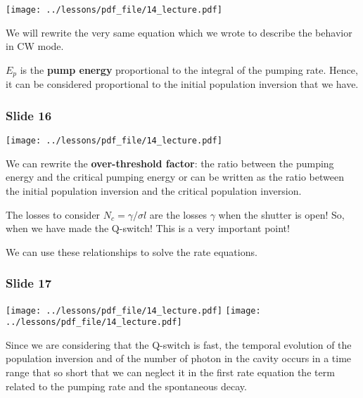 \documentclass[../main/main.tex]{subfiles}
\begin{document}
\begin{minipage}[]{0.5\linewidth}
\centering
\texttt{[image: ../lessons/pdf\_file/14\_lecture.pdf]}
\end{minipage}
\hspace{0.3cm}\vspace{0.3cm}
\begin{minipage}[c]{0.47\linewidth}

We will rewrite the very same equation which we wrote to describe the behavior in CW mode.

\( E_p \) is the \textbf{pump energy} proportional to the integral of the pumping rate. Hence, it can be considered proportional to the initial population inversion that we have.

\end{minipage}

\subsubsection*{Slide 16}

\begin{minipage}[]{0.5\linewidth}
\centering
\texttt{[image: ../lessons/pdf\_file/14\_lecture.pdf]}
\end{minipage}
\hspace{0.3cm}\vspace{0.3cm}
\begin{minipage}[c]{0.47\linewidth}

We can rewrite the \textbf{over-threshold factor}: the ratio between the pumping energy and the critical pumping energy or can be written as the ratio between the initial population inversion and the critical population inversion.

The losses to consider \( N_c = \gamma / \sigma l  \) are the losses \( \gamma   \) when the shutter is open! So, when we have made the Q-switch!
This is a very important point!

We can use these relationships to solve the rate equations.
\end{minipage}


\subsubsection*{Slide 17}

\begin{minipage}[]{0.5\linewidth}
\centering
\texttt{[image: ../lessons/pdf\_file/14\_lecture.pdf]}
\texttt{[image: ../lessons/pdf\_file/14\_lecture.pdf]}
\end{minipage}
\hspace{0.3cm}\vspace{0.3cm}
\begin{minipage}[c]{0.47\linewidth}

Since we are considering that the Q-switch is fast, the temporal evolution of the population inversion and of the number of photon in the cavity occurs in a time range that so short that we can neglect it in the first rate equation the term related to the pumping rate and the spontaneous decay.   

\end{minipage}
\end{document}
